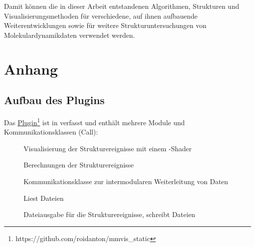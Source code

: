 Damit können die in dieser Arbeit entstandenen Algorithmen, Strukturen und Visualisierungsmethoden für verschiedene, auf ihnen aufbauende Weiterentwicklungen sowie für weitere Strukturuntersuchungen von Molekulardynamikdaten verwendet werden.





\appendix

\chapter{Anhang}

\section{Aufbau des Plugins}\label{sec:pluginaufbau}
Das \href{https://github.com/roidanton/mmvis_static}{Plugin}\footnote{https://github.com/roidanton/mmvis\_static} ist in  verfasst und enthält mehrere Module und Kommunikationsklassen (Call):
\begin{description}
	\item [] Visualisierung der Strukturereignisse mit einem -Shader
	\item [] Berechnungen der Strukturereignisse
	\item [] Kommunikationsklasse zur intermodularen Weiterleitung von Daten
	\item [] Liest \MMSE Dateien
	\item [] Dateiausgabe für die Strukturereignisse, schreibt \MMSE Dateien
\end{description}


